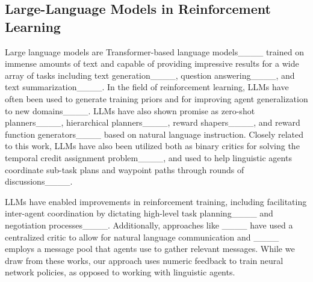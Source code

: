 \subsection{Large-Language Models in Reinforcement Learning}
Large language models are Transformer-based language models____ trained on immense amounts of text and capable of providing impressive results for a wide array of tasks including text generation____, question answering____, and text summarization____. In the field of reinforcement learning, LLMs have often been used to generate training priors and for improving agent  generalization to new domains____. LLMs have also shown promise as zero-shot planners____, hierarchical planners____, reward shapers____, and reward function generators____ based on natural language instruction. Closely related to this work, LLMs have also been utilized both as binary critics for solving the temporal credit assignment problem____, and used to help linguistic agents coordinate sub-task plans and waypoint paths through rounds of discussions____.

LLMs have enabled improvements in reinforcement training, including facilitating inter-agent coordination by dictating high-level task planning____ and negotiation processes____. Additionally, approaches like ____ have used a centralized critic to allow for natural language communication and ____ employs a message pool that agents use to gather relevant messages. While we draw from these works, our approach uses numeric feedback to train neural network policies, as opposed to working with linguistic agents.